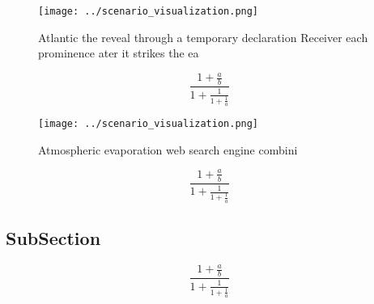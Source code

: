 \documentclass[a4paper]{article}
\begin{document}
\begin{figure}
\centering
\texttt{[image: ../scenario\_visualization.png]}
\caption{Atlantic the reveal through a temporary declaration Receiver each prominence ater it strikes the ea
}
\end{figure}
 
\[ \frac{1+\frac{a}{b}}{1+\frac{1}{1+\frac{1}{a}}} \]

\begin{figure}
\centering
\texttt{[image: ../scenario\_visualization.png]}
\caption{Atmospheric evaporation web search engine combini
}
\end{figure}
 
\[ \frac{1+\frac{a}{b}}{1+\frac{1}{1+\frac{1}{a}}} \]

\subsection{SubSection}

\[ \frac{1+\frac{a}{b}}{1+\frac{1}{1+\frac{1}{a}}} \]
\end{document}
